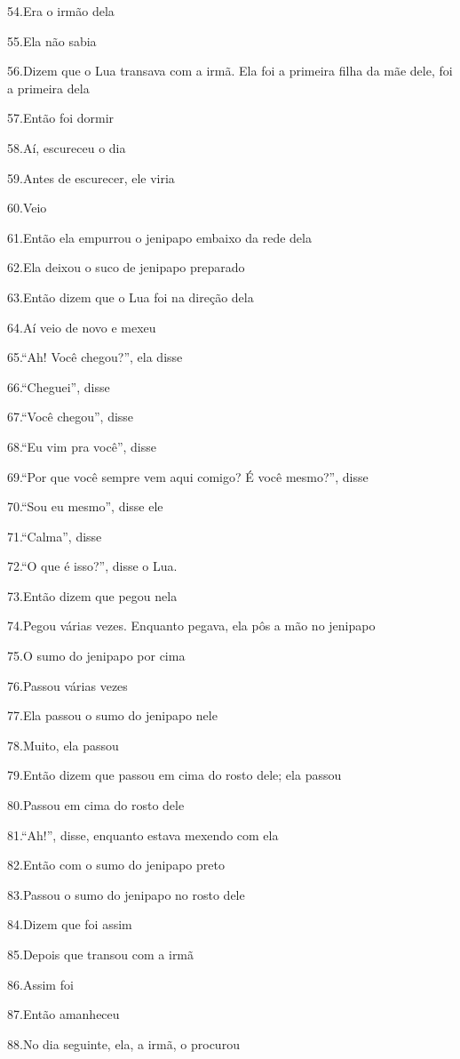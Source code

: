54.Era o irmão dela

55.Ela não sabia

56.Dizem que o Lua transava com a irmã. Ela foi a primeira filha da mãe
dele, foi a primeira dela

57.Então foi dormir

58.Aí, escureceu o dia

59.Antes de escurecer, ele viria

60.Veio

61.Então ela empurrou o jenipapo embaixo da rede dela

62.Ela deixou o suco de jenipapo preparado

63.Então dizem que o Lua foi na direção dela

64.Aí veio de novo e mexeu

65.``Ah! Você chegou?'', ela disse

66.``Cheguei'', disse

67.``Você chegou'', disse

68.``Eu vim pra você'', disse

69.``Por que você sempre vem aqui comigo? É você mesmo?'', disse

70.``Sou eu mesmo'', disse ele

71.``Calma'', disse

72.``O que é isso?'', disse o Lua.

73.Então dizem que pegou nela

74.Pegou várias vezes. Enquanto pegava, ela pôs a mão no jenipapo

75.O sumo do jenipapo por cima

76.Passou várias vezes

77.Ela passou o sumo do jenipapo nele

78.Muito, ela passou

79.Então dizem que passou em cima do rosto dele; ela passou

80.Passou em cima do rosto dele

81.``Ah!'', disse, enquanto estava mexendo com ela

82.Então com o sumo do jenipapo preto

83.Passou o sumo do jenipapo no rosto dele

84.Dizem que foi assim

85.Depois que transou com a irmã

86.Assim foi

87.Então amanheceu

88.No dia seguinte, ela, a irmã, o procurou

